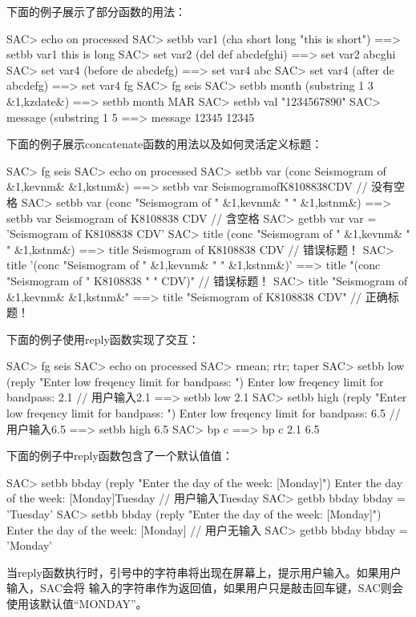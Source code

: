 下面的例子展示了部分函数的用法：
\begin{SACCode}
SAC> echo on processed
SAC> setbb var1 (cha short long "this is short")
 ==>  setbb var1 this is long
SAC> set var2 (del def abcdefghi)
 ==>  set var2 abcghi
SAC> set var4 (before de abcdefg)
 ==>  set var4 abc
SAC> set var4 (after de abcdefg)
 ==>  set var4 fg
SAC> fg seis
SAC> setbb month (substring 1 3 &1,kzdate&)
 ==>  setbb month MAR
SAC> setbb val "1234567890"
SAC> message (substring 1 5 %
 ==>  message 12345
 12345
\end{SACCode}

下面的例子展示concatenate函数的用法以及如何灵活定义标题：
\begin{SACCode}
SAC> fg seis
SAC> echo on processed
SAC> setbb var (conc Seismogram of &1,kevnm& &1,kstnm&)
 ==>  setbb var SeismogramofK8108838CDV                 // 没有空格
SAC> setbb var (conc "Seismogram of " &1,kevnm& " " &1,kstnm&)
 ==>  setbb var Seismogram of K8108838 CDV              // 含空格
SAC> getbb var
 var = 'Seismogram of K8108838 CDV'
SAC> title (conc "Seismogram of " &1,kevnm& " " &1,kstnm&)
 ==>  title Seismogram of K8108838 CDV                  // 错误标题！
SAC> title '(conc "Seismogram of " &1,kevnm& " " &1,kstnm&)'
 ==>  title "(conc "Seismogram of " K8108838 " " CDV)"  // 错误标题！
SAC> title "Seismogram of &1,kevnm& &1,kstnm&"          
 ==>  title "Seismogram of K8108838 CDV"                // 正确标题！
\end{SACCode}

下面的例子使用reply函数实现了交互：
\begin{SACCode}
SAC> fg seis
SAC> echo on processed
SAC> rmean; rtr; taper
SAC> setbb low (reply "Enter low freqency limit for bandpass: ")
Enter low freqency limit for bandpass: 2.1          // 用户输入2.1
 ==>  setbb low 2.1
SAC> setbb high (reply "Enter low freqency limit for bandpass: ")
Enter low freqency limit for bandpass: 6.5          // 用户输入6.5
 ==>  setbb high 6.5
SAC> bp c %
 ==>  bp c 2.1 6.5
\end{SACCode}

下面的例子中reply函数包含了一个默认值值：
\begin{SACCode}
SAC> setbb bbday (reply "Enter the day of the week: [Monday]")
Enter the day of the week: [Monday]Tuesday      // 用户输入Tuesday
SAC> getbb bbday
 bbday = 'Tuesday'
SAC> setbb bbday (reply "Enter the day of the week: [Monday]")
Enter the day of the week: [Monday]             // 用户无输入
SAC> getbb bbday
 bbday = 'Monday'
\end{SACCode}
当reply函数执行时，引号中的字符串将出现在屏幕上，提示用户输入。如果用户输入，SAC会将
输入的字符串作为返回值，如果用户只是敲击回车键，SAC则会使用该默认值``MONDAY''。

